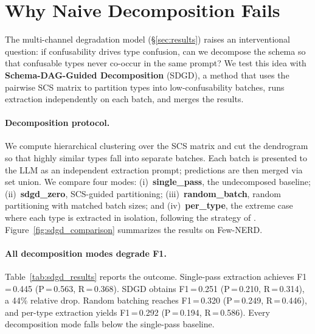 \section{Why Naive Decomposition Fails}
\label{sec:sdgd}

The multi-channel degradation model (\S\ref{sec:results}) raises an interventional question: if confusability drives type confusion, can we decompose the schema so that confusable types never co-occur in the same prompt?  We test this idea with \textbf{Schema-DAG-Guided Decomposition} (SDGD), a method that uses the pairwise SCS matrix to partition types into low-confusability batches, runs extraction independently on each batch, and merges the results.

\paragraph{Decomposition protocol.}
We compute hierarchical clustering over the SCS matrix and cut the dendrogram so that highly similar types fall into separate batches. Each batch is presented to the LLM as an independent extraction prompt; predictions are then merged via set union. We compare four modes: (i)~\textbf{single\_pass}, the undecomposed baseline; (ii)~\textbf{sdgd\_zero}, SCS-guided partitioning; (iii)~\textbf{random\_batch}, random partitioning with matched batch sizes; and (iv)~\textbf{per\_type}, the extreme case where each type is extracted in isolation, following the strategy of \citet{uniner-2024}. Figure~\ref{fig:sdgd_comparison} summarizes the results on Few-NERD.

\paragraph{All decomposition modes degrade F1.}
Table~\ref{tab:sdgd_results} reports the outcome.  Single-pass extraction achieves F1\,=\,0.445 (P\,=\,0.563, R\,=\,0.368).  SDGD obtains F1\,=\,0.251 (P\,=\,0.210, R\,=\,0.314), a 44\% relative drop.  Random batching reaches F1\,=\,0.320 (P\,=\,0.249, R\,=\,0.446), and per-type extraction yields F1\,=\,0.292 (P\,=\,0.194, R\,=\,0.586).  Every decomposition mode falls below the single-pass baseline.

